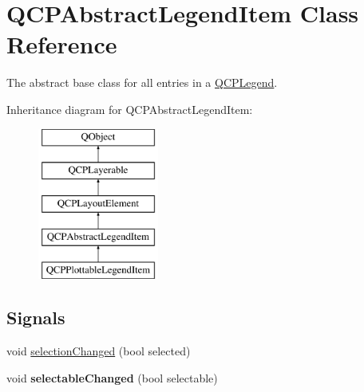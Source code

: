 \hypertarget{class_q_c_p_abstract_legend_item}{}\section{Q\+C\+P\+Abstract\+Legend\+Item Class Reference}
\label{class_q_c_p_abstract_legend_item}


The abstract base class for all entries in a \hyperlink{class_q_c_p_legend}{Q\+C\+P\+Legend}.  


Inheritance diagram for Q\+C\+P\+Abstract\+Legend\+Item\+:\begin{figure}[H]
\begin{center}
\leavevmode
\includegraphics[height=5.000000cm]{class_q_c_p_abstract_legend_item}
\end{center}
\end{figure}
\subsection*{Signals}
\begin{DoxyCompactItemize}
\item 
void \hyperlink{class_q_c_p_abstract_legend_item_a7cb61fdfbaf69c590bacb8f9e7099d9e}{selection\+Changed} (bool selected)
\item 
\mbox{\label{class_q_c_p_abstract_legend_item_abc4d779b938cc9235f9196737dbaa6bd}} 
void {\bfseries selectable\+Changed} (bool selectable)
\end{DoxyCompactItemize}
